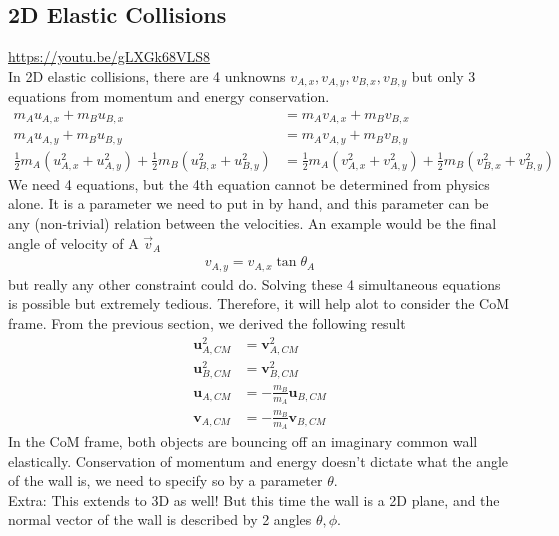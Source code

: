 \documentclass{article}
\begin{document}
\subsection{2D Elastic Collisions}
\url{https://youtu.be/gLXGk68VLS8}\\
In 2D elastic collisions, there are 4 unknowns $v_{A,x}, v_{A,y}, v_{B,x}, v_{B,y}$ but only 3 equations from momentum and energy conservation.
\begin{align}
m_A u_{A,x} + m_B u_{B,x} &= m_A v_{A,x} + m_B v_{B,x} \\
m_A u_{A,y} + m_B u_{B,y} &= m_A v_{A,y} + m_B v_{B,y} \\
    \frac{1}{2} m_A (u_{A,x}^2 + u_{A,y}^2) + \frac{1}{2} m_B (u_{B,x}^2 + u_{B,y}^2) 
 &= \frac{1}{2} m_A (v_{A,x}^2 + v_{A,y}^2) + \frac{1}{2} m_B (v_{B,x}^2 + v_{B,y}^2) 
\end{align}
We need 4 equations, but the 4th equation cannot be determined from physics alone. It is a parameter we need to put in by hand, and this parameter can be any (non-trivial) relation between the velocities. An example would be the final angle of velocity of A $\vec{v}_{A}$
\begin{align}
    v_{A,y} = v_{A,x} \tan \theta_A
\end{align}
but really any other constraint could do. Solving these 4 simultaneous equations is possible but extremely tedious. Therefore, it will help alot to consider the CoM frame. From the previous section, we derived the following result
\begin{align}
    \mathbf{u}_{A,CM}^2 &= \mathbf{v}_{A,CM}^2 \\ 
    \mathbf{u}_{B,CM}^2 &= \mathbf{v}_{B,CM}^2 \\ 
    \mathbf{u}_{A,CM} &= -\frac{m_B}{m_A} \mathbf{u}_{B,CM}\\
    \mathbf{v}_{A,CM} &= -\frac{m_B}{m_A} \mathbf{v}_{B,CM}
\end{align}
In the CoM frame, both objects are bouncing off an imaginary common wall elastically. Conservation of momentum and energy doesn't dictate what the angle of the wall is, we need to specify so by a parameter $\theta$. \\[10pt]
Extra: This extends to 3D as well! But this time the wall is a 2D plane, and the normal vector of the wall is described by 2 angles $\theta,\phi$.\\[10pt]
\end{document}

